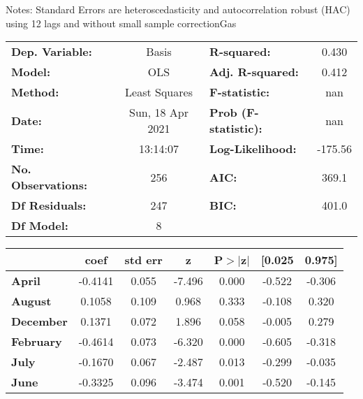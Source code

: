 Notes: \newline
 [1] Standard Errors are heteroscedasticity and autocorrelation robust (HAC) using 12 lags and without small sample correctionGas\begin{center}
\begin{tabular}{lclc}
\toprule
\textbf{Dep. Variable:}    &      Basis       & \textbf{  R-squared:         } &     0.430   \\
\textbf{Model:}            &       OLS        & \textbf{  Adj. R-squared:    } &     0.412   \\
\textbf{Method:}           &  Least Squares   & \textbf{  F-statistic:       } &       nan   \\
\textbf{Date:}             & Sun, 18 Apr 2021 & \textbf{  Prob (F-statistic):} &      nan    \\
\textbf{Time:}             &     13:14:07     & \textbf{  Log-Likelihood:    } &   -175.56   \\
\textbf{No. Observations:} &         256      & \textbf{  AIC:               } &     369.1   \\
\textbf{Df Residuals:}     &         247      & \textbf{  BIC:               } &     401.0   \\
\textbf{Df Model:}         &           8      & \textbf{                     } &             \\
\bottomrule
\end{tabular}
\begin{tabular}{lcccccc}
                  & \textbf{coef} & \textbf{std err} & \textbf{z} & \textbf{P$> |$z$|$} & \textbf{[0.025} & \textbf{0.975]}  \\
\midrule
\textbf{April}    &      -0.4141  &        0.055     &    -7.496  &         0.000        &       -0.522    &       -0.306     \\
\textbf{August}   &       0.1058  &        0.109     &     0.968  &         0.333        &       -0.108    &        0.320     \\
\textbf{December} &       0.1371  &        0.072     &     1.896  &         0.058        &       -0.005    &        0.279     \\
\textbf{February} &      -0.4614  &        0.073     &    -6.320  &         0.000        &       -0.605    &       -0.318     \\
\textbf{July}     &      -0.1670  &        0.067     &    -2.487  &         0.013        &       -0.299    &       -0.035     \\
\textbf{June}     &      -0.3325  &        0.096     &    -3.474  &         0.001        &       -0.520    &       -0.145     \\

\end{tabular}
\end{center}
